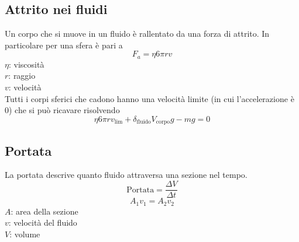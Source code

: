 \subsection{Attrito nei fluidi}
Un corpo che si muove in un fluido è rallentato da una forza di attrito. In particolare per una
sfera è pari a
\begin{equation*}
  F_a = \eta 6\pi rv
\end{equation*}
$\eta$: viscosità\\
$r$: raggio\\
$v$: velocità\\ [\baselineskip]
Tutti i corpi sferici che cadono hanno una velocità limite (in cui l'accelerazione è $0$) che si può
ricavare risolvendo
\begin{equation*}
  \eta6\pi rv_{\text{lim}}+\delta_{\text{fluido}}V_{\text{corpo}}g-mg=0
\end{equation*}

\begin{center}
\end{center}

\subsection{Portata}
La portata descrive quanto fluido attraversa una sezione nel tempo.
\begin{equation*}
  \text{Portata} = \frac{\Delta V}{\Delta t} 
\end{equation*}
\begin{equation*}
  A_1v_1=A_2v_2
\end{equation*}
$A$: area della sezione\\
$v$: velocità del fluido\\
$V$: volume

